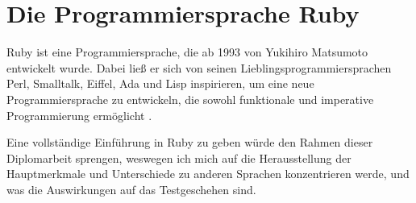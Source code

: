 \section{Die Programmiersprache Ruby}

Ruby ist eine Programmiersprache, die ab 1993 von Yukihiro Matsumoto entwickelt wurde. Dabei ließ er sich von seinen Lieblingsprogrammiersprachen Perl, Smalltalk, Eiffel, Ada und Lisp inspirieren, um eine neue Programmiersprache zu entwickeln, die sowohl funktionale und imperative Programmierung ermöglicht \citep{ruby_visual_identity_team_about_2011}. 

Eine vollständige Einführung in Ruby zu geben würde den Rahmen dieser Diplomarbeit sprengen, weswegen ich mich auf die Herausstellung der Hauptmerkmale und Unterschiede zu anderen Sprachen konzentrieren werde, und was die Auswirkungen auf das Testgeschehen sind.

